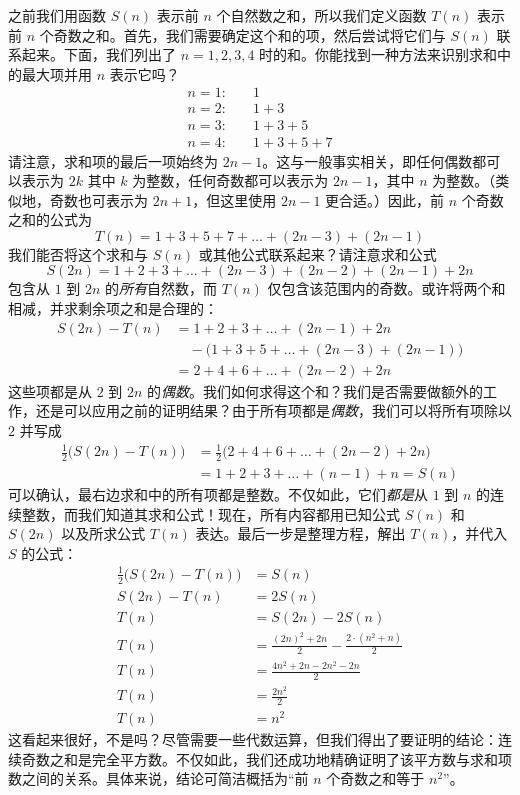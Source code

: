 之前我们用函数 $S(n)$ 表示前 $n$ 个自然数之和，所以我们定义函数 $T(n)$ 表示前 $n$ 个奇数之和。首先，我们需要确定这个和的项，然后尝试将它们与 $S(n)$ 联系起来。下面，我们列出了 $n = 1, 2, 3, 4$ 时的和。你能找到一种方法来识别求和中的最大项并用 $n$ 表示它吗？
\begin{align*}
    n=1: &\quad 1\\
    n=2: &\quad 1+3\\
    n=3: &\quad 1+3+5\\
    n=4: &\quad 1+3+5+7
\end{align*}
请注意，求和项的最后一项始终为 $2n-1$。这与一般事实相关，即任何偶数都可以表示为 $2k$ 其中 $k$ 为整数，任何奇数都可以表示为 $2n - 1$，其中 $n$ 为整数。（类似地，奇数也可表示为 $2n + 1$，但这里使用 $2n - 1$ 更合适。）因此，前 $n$ 个奇数之和的公式为
\[T(n) = 1 + 3 + 5 + 7 + \dots + (2n - 3) + (2n - 1)\]
我们能否将这个求和与 $S(n)$ 或其他公式联系起来？请注意求和公式
\[S(2n) = 1 + 2 + 3 + \dots + (2n - 3) + (2n - 2) + (2n - 1) + 2n\]
包含从 $1$ 到 $2n$ 的\emph{所有}自然数，而 $T(n)$ 仅包含该范围内的奇数。或许将两个和相减，并求剩余项之和是合理的：
\begin{align*}
    S(2n) - T(n) &= 1 + 2 + 3 + \dots + (2n - 1) + 2n \\
    &\quad -\big(1 + 3 + 5 + \dots + (2n - 3) + (2n - 1)\big) \\
    & =  2 + 4 + 6 + \dots + (2n - 2) + 2n
\end{align*}
这些项都是从 $2$ 到 $2n$ 的\emph{偶数}。我们如何求得这个和？我们是否需要做额外的工作，还是可以应用之前的证明结果？由于所有项都是\emph{偶数}，我们可以将所有项除以 $2$ 并写成
\begin{align*}
    \frac{1}{2}\big(S(2n) - T(n)\big) &= \frac{1}{2}\big(2 + 4 + 6 + \dots + (2n - 2) + 2n\big)\\
    &= 1 + 2 + 3 + \dots + (n - 1) + n = S(n)
\end{align*}
可以确认，最右边求和中的所有项都是整数。不仅如此，它们\emph{都是}从 $1$ 到 $n$ 的连续整数，而我们知道其求和公式！现在，所有内容都用已知公式 $S(n)$ 和 $S(2n)$ 以及所求公式 $T(n)$ 表达。最后一步是整理方程，解出 $T(n)$，并代入 $S$ 的公式：
\begin{align*}
    \frac{1}{2}\big(S(2n) - T(n)\big) &= S(n) \\
    S(2n) - T(n) &= 2S(n) \\
    T(n) &= S(2n) - 2S(n) \\
    T(n) &= \frac{(2n)^2 + 2n}{2} - \frac{2 \cdot (n^2 + n)}{2} \\
    T(n) &= \frac{4n^2 + 2n - 2n^2 - 2n}{2} \\
    T(n) &= \frac{2n^2}{2} \\ 
    T(n) &= n^2
\end{align*}
这看起来很好，不是吗？尽管需要一些代数运算，但我们得出了要证明的结论：连续奇数之和是完全平方数。不仅如此，我们还成功地精确证明了该平方数与求和项数之间的关系。具体来说，结论可简洁概括为``前 $n$ 个奇数之和等于 $n^2$''。

